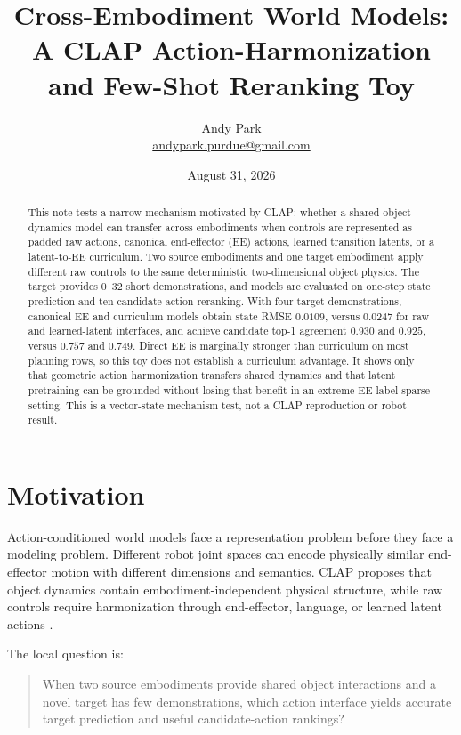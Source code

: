\documentclass[11pt]{article}
\title{Cross-Embodiment World Models:\\A CLAP Action-Harmonization and Few-Shot Reranking Toy}
\author{Andy Park\\\href{mailto:andypark.purdue@gmail.com}{andypark.purdue@gmail.com}}
\date{August 31, 2026}
\begin{document}
\setlength{\emergencystretch}{3em}
\maketitle

\begin{abstract}
This note tests a narrow mechanism motivated by CLAP: whether a shared object-dynamics model can transfer across embodiments when controls are represented as padded raw actions, canonical end-effector (EE) actions, learned transition latents, or a latent-to-EE curriculum. Two source embodiments and one target embodiment apply different raw controls to the same deterministic two-dimensional object physics. The target provides 0--32 short demonstrations, and models are evaluated on one-step state prediction and ten-candidate action reranking. With four target demonstrations, canonical EE and curriculum models obtain state RMSE $0.0109$, versus $0.0247$ for raw and learned-latent interfaces, and achieve candidate top-1 agreement $0.930$ and $0.925$, versus $0.757$ and $0.749$. Direct EE is marginally stronger than curriculum on most planning rows, so this toy does not establish a curriculum advantage. It shows only that geometric action harmonization transfers shared dynamics and that latent pretraining can be grounded without losing that benefit in an extreme EE-label-sparse setting. This is a vector-state mechanism test, not a CLAP reproduction or robot result.
\end{abstract}

\section{Motivation}

Action-conditioned world models face a representation problem before they face a modeling problem. Different robot joint spaces can encode physically similar end-effector motion with different dimensions and semantics. CLAP proposes that object dynamics contain embodiment-independent physical structure, while raw controls require harmonization through end-effector, language, or learned latent actions \cite{paper,project}.

The local question is:
\begin{quote}
When two source embodiments provide shared object interactions and a novel target has few demonstrations, which action interface yields accurate target prediction and useful candidate-action rankings?
\end{quote}
\end{document}
